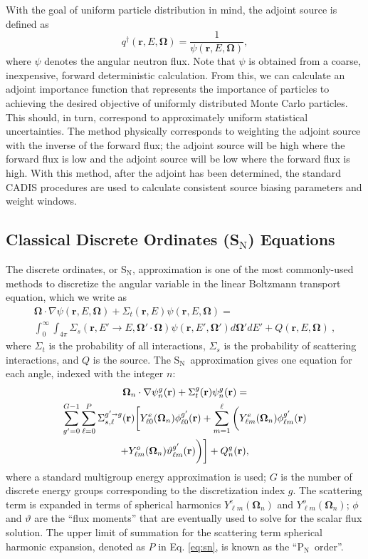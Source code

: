\documentclass{article} %
\newcommand{\bo}{\mathbf\Omega}
\newcommand{\vecr}{\textbf{r}}
\newcommand{\sn}{S$_\mathrm{N}$}
\newcommand{\pn}{P$_\mathrm{N}$}
\newcommand{\Ye}[2]{\ensuremath{Y^e_{#1}(\bo_#2)}}
\newcommand{\Yo}[2]{\ensuremath{Y^o_{#1}(\bo_#2)}}
\newcommand{\sa}{\shortrightarrow}
\begin{document}
With the goal of uniform particle distribution in mind, the adjoint source is
defined as
%
\begin{equation}
q^{\dagger}(\vecr,E,\bo) = \frac{1}{\psi(\vecr,E,\bo)},
\end{equation}
%
where $\psi$ denotes the angular neutron flux. Note that $\psi$ is obtained
from a coarse, inexpensive, forward deterministic calculation. From this, we
can calculate an adjoint importance function that represents the importance of
particles to achieving the desired objective of uniformly distributed Monte
Carlo particles. This should, in turn, correspond to approximately uniform
statistical uncertainties. The method physically corresponds to weighting the
adjoint source with the inverse of the forward flux; the adjoint source will
be high where the forward flux is low and the adjoint source will be low where
the forward flux is high. With this method, after the adjoint has been
determined, the standard CADIS procedures are used to calculate consistent
source biasing parameters and weight windows.

\subsection{Classical Discrete Ordinates (\sn) Equations}

The discrete ordinates, or \sn, approximation is one of the most commonly-used
methods to discretize the angular variable in the linear Boltzmann
transport equation, which we write as
%
\begin{multline}
\bo \cdot \nabla \psi(\vecr,E,\bo) + \Sigma_t(\vecr,E) \psi(\vecr,E,\bo) = \\
\int_0^\infty\int_{4\pi} \Sigma_s(\vecr,E'\rightarrow E,\bo'\cdot\bo)
\psi(\vecr,E',\bo')d\bo'dE' + Q(\vecr,E,\bo) \:,
\label{eq:bte}
\end{multline}
%
where $\Sigma_t$ is the probability of all interactions, $\Sigma_s$ is the
probability of scattering interactions, and $Q$ is the source. The \sn\
approximation gives one equation for each angle, indexed with the integer $n$:
%
\begin{multline}
\bo_n \cdot \nabla \psi_n^g(\vecr) + \Sigma_t^g(\vecr)\psi_n^g(\vecr) = \\
\sum_{g'=0}^{G-1}\sum_{\ell=0}^{P}\Sigma_{s,\ell}^{g'\sa g}(\vecr)
\bigg[\Ye{\ell 0}{n}\phi_{\ell 0}^{g'}(\vecr) + \sum_{m=1}^{\ell}
\bigg(\Ye{\ell m}{n}\phi_{\ell m}^{g'}(\vecr) \\
 + \Yo{\ell m}{n}\vartheta_{\ell m}^{g'}(\vecr)\bigg)\bigg]
+ Q_n^g(\vecr),
\label{eq:sn}
\end{multline}
%
where a standard multigroup energy approximation is used; $G$ is the
number of discrete energy groups corresponding to the discretization index
$g$. The scattering term is expanded in terms of spherical harmonics
$\Ye{\ell m}{n}$ and $\Yo{\ell m}{n}$; $\phi$ and $\vartheta$ are the
``flux moments'' that are eventually used to solve for the scalar flux
solution. The upper limit of summation for the scattering term spherical
harmonic expansion, denoted as $P$ in Eq. \eqref{eq:sn}, is known as the
``\pn\ order''.
\end{document}
